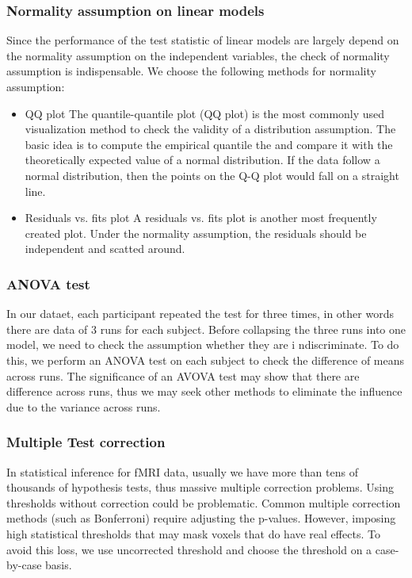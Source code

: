 \documentclass[11pt]{article}
\begin{document}
\subsubsection{Normality assumption on linear models}

Since the performance of the test statistic of linear models are largely 
depend on the normality assumption on the independent variables, the check of 
normality assumption is indispensable. We choose the following methods for 
normality assumption:

\begin{itemize}
\item{QQ plot} The quantile-quantile plot (QQ plot) is the most commonly used 
visualization method to check the validity of a distribution assumption. The 
basic idea is to compute the empirical quantile the and compare it with the 
theoretically expected value of a normal distribution. If the data follow a 
normal distribution, then the points on the Q-Q plot would fall on a straight 
line. 
\item{Residuals vs. fits plot} A residuals vs. fits plot is another most 
frequently created plot. Under the normality assumption, the residuals should 
be independent and scatted around.
\end{itemize}

\subsubsection{ANOVA test}

In our dataet, each participant repeated the test for three times, in other 
words there are data of 3 runs for each subject. Before collapsing the three 
runs into one model, we need to check the assumption whether they are i
ndiscriminate.  To do this, we perform an ANOVA test on each subject to check 
the difference of means across runs. The significance of an AVOVA test may 
show that there are difference across runs, thus we may seek other methods to 
eliminate the influence due to the variance across runs.

\subsubsection{Multiple Test correction}

In statistical inference for fMRI data, usually we have more than tens of 
thousands of hypothesis tests, thus massive multiple correction problems. 
Using thresholds without correction could be problematic. Common multiple 
correction methods (such as Bonferroni) require adjusting the p-values. 
However, imposing high statistical thresholds that may mask voxels that do have 
real effects. To avoid this loss, we use uncorrected threshold and choose the 
threshold on a case-by-case basis.
\end{document}
